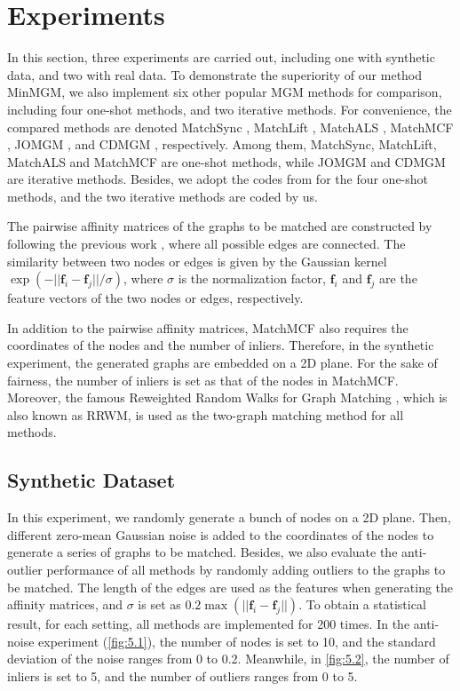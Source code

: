 \section{Experiments}

In this section, three experiments are carried out, including one with synthetic data, and two with real data. To demonstrate the superiority of our method MinMGM, we also implement six other popular MGM methods for comparison, including four one-shot methods, and two iterative methods. For convenience, the compared methods are denoted MatchSync \cite{pachauri2013solving}, MatchLift \cite{chen2014nearoptimal}, MatchALS \cite{zhou2015multiimage}, MatchMCF \cite{wang2018multiimage}, JOMGM \cite{yan2013joint}, and CDMGM \cite{7001592}, respectively. Among them, MatchSync, MatchLift, MatchALS and MatchMCF are one-shot methods, while JOMGM and CDMGM are iterative methods. Besides, we adopt the codes from \cite{wang2018multiimage} for the four one-shot methods, and the two iterative methods are coded by us. 

The pairwise affinity matrices of the graphs to be matched are constructed by following the previous work \cite{cho2010reweighted}, where all possible edges are connected. The similarity between two nodes or edges is given by the Gaussian kernel $\exp(-||\bm f_i - \bm f_j|| / \sigma)$, where $\sigma$ is the normalization factor, $\bm f_i$ and $\bm f_j$ are the feature vectors of the two nodes or edges, respectively.

In addition to the pairwise affinity matrices, MatchMCF also requires the coordinates of the nodes and the number of inliers. Therefore, in the synthetic experiment, the generated graphs are embedded on a 2D plane. For the sake of fairness, the number of inliers is set as that of the nodes in MatchMCF. Moreover, the famous Reweighted Random Walks for Graph Matching \cite{cho2010reweighted}, which is also known as RRWM, is used as the two-graph matching method for all methods.

\subsection{Synthetic Dataset}

In this experiment, we randomly generate a bunch of nodes on a 2D plane. Then, different zero-mean Gaussian noise is added to the coordinates of the nodes to generate a series of graphs to be matched. Besides, we also evaluate the anti-outlier performance of all methods by randomly adding outliers to the graphs to be matched. The length of the edges are used as the features when generating the affinity matrices, and $\sigma$ is set as $0.2\max(||\bm f_i - \bm f_j||)$. To obtain a statistical result, for each setting, all methods are implemented for 200 times. In the anti-noise experiment (\cref{fig:5.1}), the number of nodes is set to 10, and the standard deviation of the noise ranges from 0 to 0.2. Meanwhile, in \cref{fig:5.2}, the number of inliers is set to 5, and the number of outliers ranges from 0 to 5.

